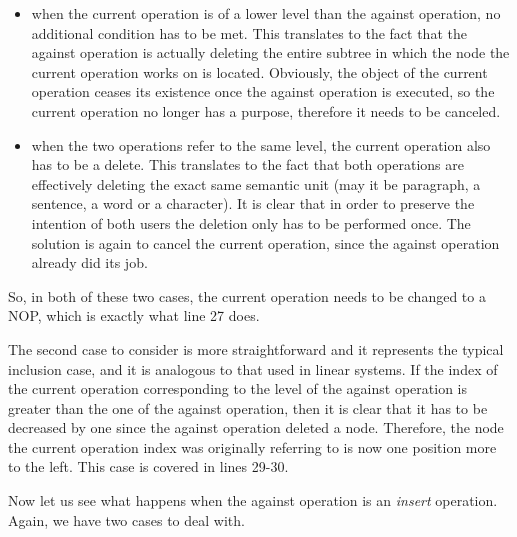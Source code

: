 \begin{itemize}
\item when the current operation is of a lower level than the against operation,
      no additional condition has to be met. This translates to the fact that
      the against operation is actually deleting the entire subtree in which the
      node the current operation works on is located. Obviously, the object of
      the current operation ceases its existence once the against operation is
      executed, so the current operation no longer has a purpose, therefore it
      needs to be canceled.
\item when the two operations refer to the same level, the current operation also
      has to be a delete. This translates to the fact that both operations are
      effectively deleting the exact same semantic unit (may it be paragraph, a
      sentence, a word or a character). It is clear that in order to preserve the
      intention of both users the deletion only has to be performed once. The solution
      is again to cancel the current operation, since the against operation already
      did its job.
\end{itemize}

So, in both of these two cases, the current operation needs to be changed to a
NOP, which is exactly what line 27 does.

The second case to consider is more straightforward and it represents the typical
inclusion case, and it is analogous to that used in linear systems. If the index of the current
operation corresponding to the level of the against operation is greater than the
one of the against operation, then it is clear that it has to be decreased by one
since the against operation deleted a node. Therefore, the node the current operation
index was originally referring to is now one position more to the left. This case
is covered in lines 29-30.

Now let us see what happens when the against operation is an \emph{insert} operation.
Again, we have two cases to deal with.


